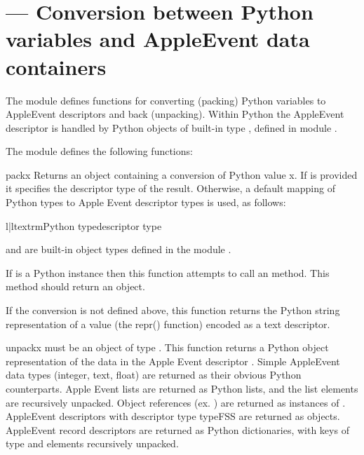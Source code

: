 \section{ ---
         Conversion between Python variables and AppleEvent data containers}



The  module defines functions for converting (packing)
Python variables to AppleEvent descriptors and back (unpacking).
Within Python the AppleEvent descriptor is handled by Python objects
of built-in type , defined in module .

The  module defines the following functions:


\begin{funcdesc}{pack}{x}
Returns an  object  containing a conversion of Python
value x. If  is provided it specifies the descriptor
type of the result. Otherwise, a default mapping of Python types to
Apple Event descriptor types is used, as follows:

\begin{tableii}{l|l}{textrm}{Python type}{descriptor type}
\end{tableii}  
 
 and  are built-in object types defined
in the module . 
  
If  is a Python instance then this function attempts to call an
 method.  This method should return an
 object.

If the conversion  is not defined above, this function returns
the Python string representation of a value (the repr() function)
encoded as a text descriptor.
\end{funcdesc}

\begin{funcdesc}{unpack}{x}
   must be an object of type . This function
  returns a Python object representation of the data in the Apple
  Event descriptor . Simple AppleEvent data types (integer,
  text, float) are returned as their obvious Python counterparts.
  Apple Event lists are returned as Python lists, and the list
  elements are recursively unpacked.  Object references
  (ex. ) are returned as instances of
  .  AppleEvent descriptors with
  descriptor type typeFSS are returned as 
  objects.  AppleEvent record descriptors are returned as Python
  dictionaries, with keys of type  and elements recursively
  unpacked.
\end{funcdesc}


